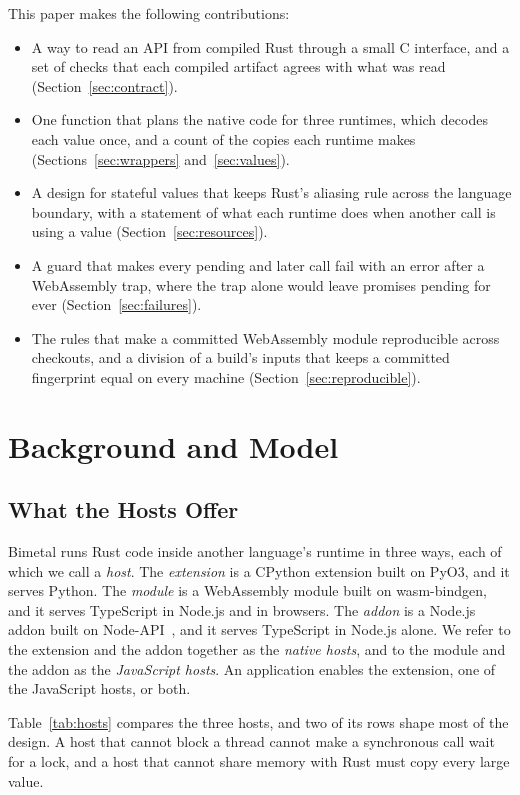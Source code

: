 \documentclass[sigconf,nonacm]{acmart}
\begin{document}
This paper makes the following contributions:
\begin{itemize}
  \item A way to read an API from compiled Rust through a small C interface, and a set of checks that each compiled artifact agrees with what was read (Section~\ref{sec:contract}).
  \item One function that plans the native code for three runtimes, which decodes each value once, and a count of the copies each runtime makes (Sections~\ref{sec:wrappers} and~\ref{sec:values}).
  \item A design for stateful values that keeps Rust's aliasing rule across the language boundary, with a statement of what each runtime does when another call is using a value (Section~\ref{sec:resources}).
  \item A guard that makes every pending and later call fail with an error after a WebAssembly trap, where the trap alone would leave promises pending for ever (Section~\ref{sec:failures}).
  \item The rules that make a committed WebAssembly module reproducible across checkouts, and a division of a build's inputs that keeps a committed fingerprint equal on every machine (Section~\ref{sec:reproducible}).
\end{itemize}

\section{Background and Model}
\label{sec:model}

\subsection{What the Hosts Offer}

Bimetal runs Rust code inside another language's runtime in three ways, each of which we call a \emph{host}. The \emph{extension} is a CPython extension built on PyO3, and it serves Python. The \emph{module} is a WebAssembly module built on wasm-bindgen, and it serves TypeScript in Node.js and in browsers. The \emph{addon} is a Node.js addon built on Node-API~\cite{nodeapi}, and it serves TypeScript in Node.js alone. We refer to the extension and the addon together as the \emph{native hosts}, and to the module and the addon as the \emph{JavaScript hosts}. An application enables the extension, one of the JavaScript hosts, or both.

Table~\ref{tab:hosts} compares the three hosts, and two of its rows shape most of the design. A host that cannot block a thread cannot make a synchronous call wait for a lock, and a host that cannot share memory with Rust must copy every large value.
\end{document}
